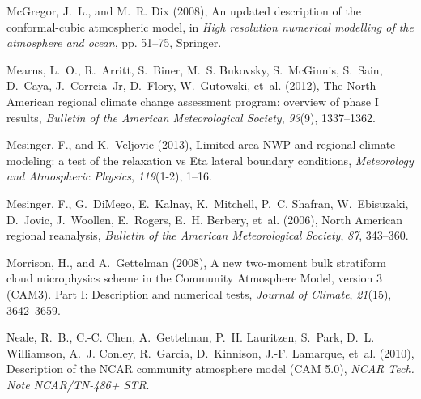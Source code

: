 \documentclass[ms]{agutex}   %
\begin{document}
\begin{article}
\begin{thebibliography}{84}
McGregor, J.~L., and M.~R. Dix (2008), An updated description of the
  conformal-cubic atmospheric model, in \textit{High resolution numerical
  modelling of the atmosphere and ocean}, pp. 51--75, Springer.

Mearns, L.~O., R.~Arritt, S.~Biner, M.~S. Bukovsky, S.~McGinnis, S.~Sain,
  D.~Caya, J.~Correia~Jr, D.~Flory, W.~Gutowski, et~al. (2012), {The North
  American regional climate change assessment program: overview of phase I
  results}, \textit{Bulletin of the American Meteorological Society},
  \textit{93}(9), 1337--1362.

Mesinger, F., and K.~Veljovic (2013), {Limited area NWP and regional climate
  modeling: a test of the relaxation vs Eta lateral boundary conditions},
  \textit{Meteorology and Atmospheric Physics}, \textit{119}(1-2), 1--16.

Mesinger, F., G.~DiMego, E.~Kalnay, K.~Mitchell, P.~C. Shafran, W.~Ebisuzaki,
  D.~Jovic, J.~Woollen, E.~Rogers, E.~H. Berbery, et~al. (2006), {North
  American regional reanalysis}, \textit{Bulletin of the American
  Meteorological Society}, \textit{87}, 343--360.

Morrison, H., and A.~Gettelman (2008), {A new two-moment bulk stratiform cloud
  microphysics scheme in the Community Atmosphere Model, version 3 (CAM3). Part
  I: Description and numerical tests}, \textit{Journal of Climate},
  \textit{21}(15), 3642--3659.

Neale, R.~B., C.-C. Chen, A.~Gettelman, P.~H. Lauritzen, S.~Park, D.~L.
  Williamson, A.~J. Conley, R.~Garcia, D.~Kinnison, J.-F. Lamarque, et~al.
  (2010{}), {Description of the NCAR community atmosphere model
  (CAM 5.0)}, \textit{NCAR Tech. Note NCAR/TN-486+ STR}.


\end{thebibliography}
\end{article}
\end{document}
